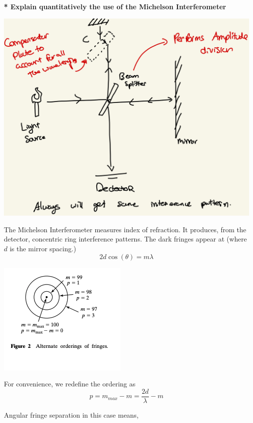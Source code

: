 \documentclass[10pt]{article}
\newcommand*{\lo}[1]{
    \textbf{* #1} \newline
}
\begin{document}
\lo{Explain quantitatively the use of the Michelson Interferometer}

\begin{center}
    \includegraphics*[scale = .2]{imgs/michelson-infrometer.jpeg}
\end{center}

The Michelson Interferometer measures index of refraction. It produces, from the detector, concentric ring interference patterns. The dark fringes appear at (where $d$ is the mirror spacing.)
\[2d\cos(\theta) = m\lambda\]

\newpage

\begin{center}
    \includegraphics*[scale = 1]{imgs/ordering.png}
\end{center}

For convenience, we redefine the ordering as \[p = m_{max} - m = \frac{2d}{\lambda} - m\]

Angular fringe separation in this case means,
\end{document}
